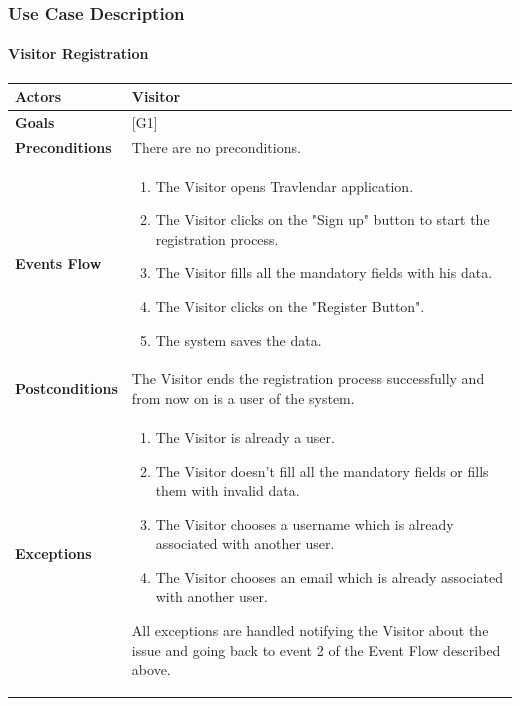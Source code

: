 \documentclass[12pt]{article}
\begin{document}
\subsubsection{Use Case Description}
\paragraph{Visitor Registration}

\begin{center}
    \begin{tabular} { |p{}|p{}| }
        \hline
        \textbf{Actors} & Visitor \\ 
        \hline
        \textbf{Goals} & {[G1]} \\ 
        \hline  
        \textbf{Preconditions} & There are no preconditions. \\ 
        \hline
        \textbf{Events Flow} & \begin{enumerate} 
                            \setlength{\itemsep}{0.5pt}
                            \item The Visitor opens Travlendar application.
                            \item The Visitor clicks on the "Sign up" button to start the registration process. 
                            \item The Visitor fills all the mandatory fields with his data. 
                            \item The Visitor clicks on the "Register Button".
                            \item The system saves the data.
                            \end{enumerate} \\
        \hline
        \textbf{Postconditions} & The Visitor ends the registration process successfully and from now on is a user of the system. \\
        \hline
        \textbf{Exceptions} & \begin{enumerate} 
                            \setlength{\itemsep}{0.5pt}
                            \item The Visitor is already a user. 
                            \item The Visitor doesn't fill all the mandatory fields or fills them with invalid data.
                            \item The Visitor chooses a username which is already associated with another user.
                            \item The Visitor chooses an email which is already associated with another user. 
                            \end{enumerate} 
                            All exceptions are handled notifying the Visitor about the issue and going back to event 2 of the Event Flow described above.\\ 
        \hline
    \end{tabular}
\end{center}
\end{document}
